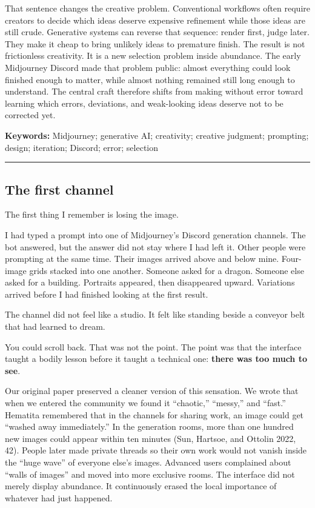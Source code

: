 \documentclass[
]{article}
\begin{document}
That sentence changes the creative problem. Conventional workflows often
require creators to decide which ideas deserve expensive refinement
while those ideas are still crude. Generative systems can reverse that
sequence: render first, judge later. They make it cheap to bring
unlikely ideas to premature finish. The result is not frictionless
creativity. It is a new selection problem inside abundance. The early
Midjourney Discord made that problem public: almost everything could
look finished enough to matter, while almost nothing remained still long
enough to understand. The central craft therefore shifts from making
without error toward learning which errors, deviations, and weak-looking
ideas deserve not to be corrected yet.

\textbf{Keywords:} Midjourney; generative AI; creativity; creative
judgment; prompting; design; iteration; Discord; error; selection

\begin{center}\rule{0.5\linewidth}{0.5pt}\end{center}

\subsection{The first channel}\label{the-first-channel}

The first thing I remember is losing the image.

I had typed a prompt into one of Midjourney's Discord generation
channels. The bot answered, but the answer did not stay where I had left
it. Other people were prompting at the same time. Their images arrived
above and below mine. Four-image grids stacked into one another. Someone
asked for a dragon. Someone else asked for a building. Portraits
appeared, then disappeared upward. Variations arrived before I had
finished looking at the first result.

The channel did not feel like a studio. It felt like standing beside a
conveyor belt that had learned to dream.

You could scroll back. That was not the point. The point was that the
interface taught a bodily lesson before it taught a technical one:
\textbf{there was too much to see}.

Our original paper preserved a cleaner version of this sensation. We
wrote that when we entered the community we found it ``chaotic,''
``messy,'' and ``fast.'' Hematita remembered that in the channels for
sharing work, an image could get ``washed away immediately.'' In the
generation rooms, more than one hundred new images could appear within
ten minutes (Sun, Hartsoe, and Ottolin 2022, 42). People later made
private threads so their own work would not vanish inside the ``huge
wave'' of everyone else's images. Advanced users complained about
``walls of images'' and moved into more exclusive rooms. The interface
did not merely display abundance. It continuously erased the local
importance of whatever had just happened.
\end{document}
